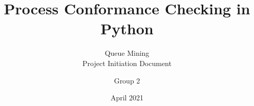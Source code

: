 \documentclass[
   12pt,                %
   a4paper,             %
   oneside,             %
   headinclude,         %
   headsepline,         %
   BCOR12mm,            %
   DIV16,               %
   halfparskip,         %
   openany,             %
   bibtotoc,            %
   pointlessnumbers,    %
   tablecaptionabove,   %
   fleqn                %
]{scrbook}[2007/12/24]  %
\numberwithin{equation}{section} %
\begin{document}
\title{Process Conformance Checking in Python}
\subtitle{Queue Mining\\
		  Project Initiation Document	}
\date{April 2021}
\author{Group 2\\}




\maketitle
\frontmatter
\tableofcontents


\mainmatter
\begingroup
\let\clearpage\relax






\endgroup
\end{document}

